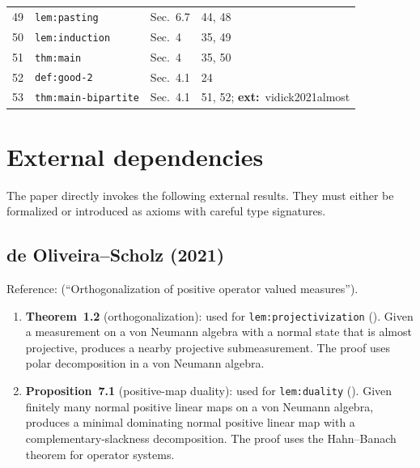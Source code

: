 \documentclass{article}
\theoremstyle{remark}
\begin{document}
\begin{longtable}{L{0.04\textwidth}L{0.32\textwidth}L{0.28\textwidth}L{0.26\textwidth}}
	49 & \texttt{lem:pasting}                       & Sec.~6.7       & 44, 48                                  \\
	50 & \texttt{lem:induction}                     & Sec.~4         & 35, 49                                  \\
	51 & \texttt{thm:main}                          & Sec.~4         & 35, 50                                  \\
	52 & \texttt{def:good-2}                        & Sec.~4.1       & 24                                      \\
	53 & \texttt{thm:main-bipartite}                & Sec.~4.1       & 51, 52; \textbf{ext:}~vidick2021almost  \\
	\bottomrule
\end{longtable}
\normalsize

\section{External dependencies}
\label{sec:external}

The paper directly invokes the following external results. They must either be
formalized or introduced as axioms with careful type signatures.

\subsection{de Oliveira--Scholz (2021)}

Reference: \cite{de2021orthogonalization}
(``Orthogonalization of positive operator valued measures'').

\begin{enumerate}
	\item \textbf{Theorem~1.2} (orthogonalization): used for
	      \texttt{lem:projectivization} ().
	      Given a measurement on a von Neumann algebra with a normal state that is
	      almost projective, produces a nearby projective submeasurement.
	      The proof uses polar decomposition in a von Neumann algebra.

	\item \textbf{Proposition~7.1} (positive-map duality): used for
	      \texttt{lem:duality} ().
	      Given finitely many normal positive linear maps on a von Neumann algebra,
	      produces a minimal dominating normal positive linear map with a
	      complementary-slackness decomposition.
	      The proof uses the Hahn--Banach theorem for operator systems.
\end{enumerate}
\end{document}
